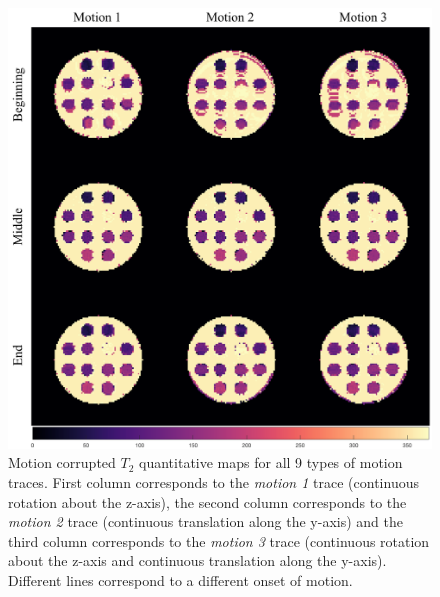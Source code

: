 \begin{figure}[ht]
    \centering
    \includegraphics[width=1\textwidth]{images/mrf/T2mapsmotion}
    \caption{Motion corrupted $T_2$ quantitative maps for all 9 types of motion traces. First column corresponds to the \textit{motion 1} trace (continuous rotation about the z-axis), the second column corresponds to the \textit{motion 2} trace (continuous translation along the y-axis) and the third column corresponds to the \textit{motion 3} trace (continuous rotation about the z-axis and continuous translation along the y-axis). Different lines correspond to a different onset of motion.}
    \label{fig:appendixT2mapsmotion}
\end{figure}

